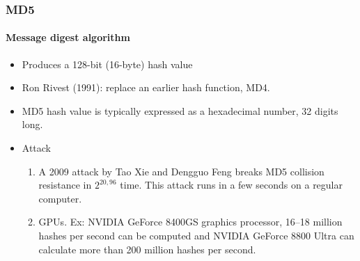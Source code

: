 \documentclass{beamer}
\begin{document}
\begin{frame}
\frametitle{MD5}
\framesubtitle{Message digest algorithm}
\begin{itemize}
\item Produces a 128-bit (16-byte) hash value
\item Ron Rivest (1991): replace an earlier hash function, MD4.
\item MD5 hash value is typically expressed as a hexadecimal number, 32 digits long.
\item Attack
\begin{enumerate}
\item A 2009 attack by Tao Xie and Dengguo Feng breaks MD5 collision resistance in $2^{20,96}$ time. This attack runs in a few seconds on a regular computer.
\item GPUs. Ex: NVIDIA GeForce 8400GS graphics processor, 16–18 million hashes per second can be computed and NVIDIA GeForce 8800 Ultra can calculate more than 200 million hashes per second.
\end{enumerate}
\end{itemize}
\end{frame}
\end{document}
